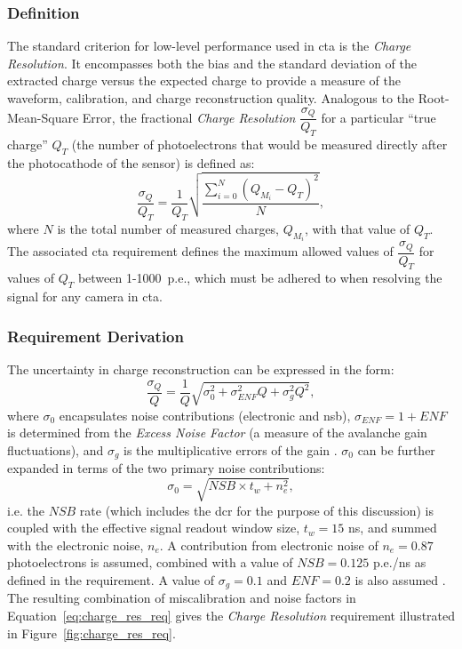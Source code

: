 \subsubsection{Definition}
The standard criterion for low-level performance used in \gls{cta} is the \textit{Charge Resolution}. It encompasses both the bias and the standard deviation of the extracted charge versus the expected charge to provide a measure of the waveform, calibration, and charge reconstruction quality. Analogous to the Root-Mean-Square Error, the fractional \textit{Charge Resolution} $\dfrac{\sigma_Q}{Q_T}$ for a particular ``true charge'' $Q_T$ (the number of photoelectrons that would be measured directly after the photocathode of the sensor) is defined as:
\begin{equation} \label{eq:charge_res}
\dfrac{\sigma_Q}{Q_T} = \dfrac{1}{Q_T} \sqrt{\dfrac{\sum_{i=0}^N (Q_{M_i} - Q_T)^2}{N}},
\end{equation}
where $N$ is the total number of measured charges, $Q_{M_i}$, with that value of $Q_T$. The associated \gls{cta} requirement defines the maximum allowed values of $\dfrac{\sigma_Q}{Q_T}$ for values of $Q_T$ between 1-1000~p.e., which must be adhered to when resolving the signal for any camera in \gls{cta}.

\subsubsection{Requirement Derivation}
The uncertainty in charge reconstruction can be expressed in the form:
\begin{equation} \label{eq:charge_res_req}
\dfrac{\sigma_Q}{Q} = \dfrac{1}{Q} \sqrt{\sigma_0^2 + \sigma_{ENF}^2 Q + \sigma_g^2 Q^2},
\end{equation}
where $\sigma_0$ encapsulates noise contributions (electronic and \gls{nsb}), $\sigma_{ENF} = 1 + \mathit{ENF}$ is determined from the \textit{Excess Noise Factor} (a measure of the avalanche gain fluctuations), and $\sigma_g$ is the multiplicative errors of the gain \cite{petophotons}\cite{Ohm2012}. $\sigma_0$ can be further expanded in terms of the two primary noise contributions:
\begin{equation} \label{eq:charge_res_nsb}
\sigma_0 = \sqrt{\mathit{NSB} \times t_w + n_e^2},
\end{equation}
i.e. the $\mathit{NSB}$ rate (which includes the \gls{dcr} for the purpose of this discussion) is coupled with the effective signal readout window size, $t_w = 15$ ns, and summed with the electronic noise, $n_e$. A contribution from electronic noise of $n_e = 0.87$ photoelectrons is assumed, combined with a value of $\mathit{NSB} = 0.125$ p.e./ns as defined in the requirement. A value of $\sigma_g = 0.1$ and $\mathit{ENF} = 0.2$ is also assumed \cite{petophotons}. The resulting combination of miscalibration and noise factors in Equation~\ref{eq:charge_res_req} gives the \textit{Charge Resolution} requirement illustrated in Figure~\ref{fig:charge_res_req}.

